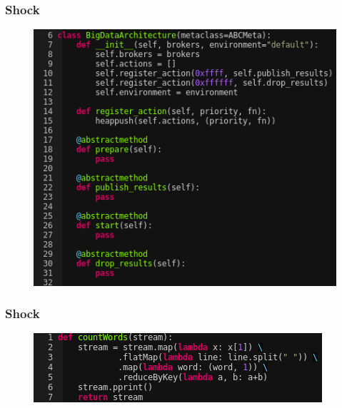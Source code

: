 \documentclass{beamer}
\begin{document}
  \begin{frame}
      \frametitle{Shock}
      \begin{figure}
          \includegraphics[scale=0.4]{figures/BigDataArchitecture.png}
      \end{figure}
  \end{frame}

  \begin{frame}
      \frametitle{Shock}
      \begin{figure}
          \includegraphics[width=\textwidth]{figures/CountWords.png}
      \end{figure}
  \end{frame}
\end{document}
